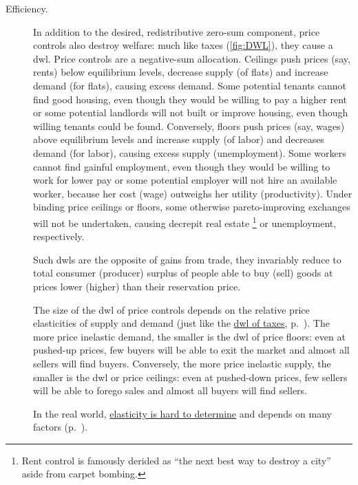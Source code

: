 \begin{description}
	\item[Efficiency.]
	In addition to the desired, redistributive zero-sum component, price controls also destroy welfare:
	much like taxes (\autoref{fig:DWL}), they cause a \gls{dwl}.
	Price controls are a negative-sum allocation.
	Ceilings push prices (say, rents) below equilibrium levels, decrease supply (of flats) and increase demand (for flats), causing excess demand.
	Some potential tenants cannot find good housing, even though they would be willing to pay a higher rent or some potential landlords will not built or improve housing, even though willing tenants could be found.
	Conversely, floors push prices (say, wages) above equilibrium levels and increase supply (of labor) and decreases demand (for labor), causing excess supply (unemployment).
	Some workers cannot find gainful employment, even though they would be willing to work for lower pay or some potential employer will not hire an available worker, because her cost (wage) outweighs her utility (productivity).
	Under binding price ceilings or floors, some otherwise pareto-improving exchanges will not be undertaken, causing decrepit real estate
	\footnote{
		Rent control is famously derided as ``the next best way to destroy a city'' aside from carpet bombing.
	}
	or unemployment, respectively.

	Such \glspl{dwl} are the opposite of gains from trade, they invariably reduce to total consumer (producer) surplus of people able to buy (sell) goods at prices lower (higher) than their reservation price.

	The size of the \gls{dwl} of price controls depends on the relative price elasticities of supply and demand (just like the \hyperref[sec:minimal-DWL]{\gls{dwl} of taxes}, p.~\pageref{sec:minimal-DWL}).
	The more price inelastic demand, the smaller is the \gls{dwl} of price floors:
	even at pushed-up prices, few buyers will be able to exit the market and almost all sellers will find buyers.
	Conversely, the more price inelastic supply, the smaller is the \gls{dwl} or price ceilings:
	even at pushed-down prices, few sellers will be able to forego sales and almost all buyers will find sellers.

	In the real world, \hyperref[sec:well-determined-incidence]{elasticity is hard to determine} and depends on many factors (p.~\pageref{sec:well-determined-incidence}).


\end{description}
